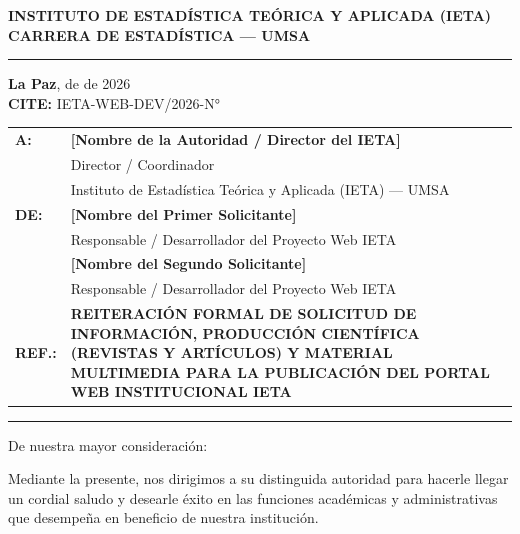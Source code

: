 \documentclass[11pt,letterpaper]{article}
\begin{document}
\begin{center}
    {\large \textbf{\color{ietaBlue}INSTITUTO DE ESTADÍSTICA TEÓRICA Y APLICADA (IETA)}}\\[2pt]
    {\small \textbf{CARRERA DE ESTADÍSTICA --- UMSA}}\\[8pt]
    \rule{\textwidth}{1.2pt}
\end{center}

\vspace{-4pt}
\begin{flushright}
    \small \textbf{La Paz}, \underline{\hspace{1.2cm}} de \underline{\hspace{2.5cm}} de 2026\\[2pt]
    \textbf{CITE:} IETA-WEB-DEV/2026-N° \underline{\hspace{1.5cm}}
\end{flushright}

\vspace{4pt}
\begin{tabularx}{\textwidth}{@{}l X@{}}
    \textbf{A:} & \textbf{[Nombre de la Autoridad / Director del IETA]} \\
                & Director / Coordinador \\
                & Instituto de Estadística Teórica y Aplicada (IETA) --- UMSA \\[6pt]
    \textbf{DE:} & \textbf{[Nombre del Primer Solicitante]} \\
                 & Responsable / Desarrollador del Proyecto Web IETA \\[4pt]
                 & \textbf{[Nombre del Segundo Solicitante]} \\
                 & Responsable / Desarrollador del Proyecto Web IETA \\[6pt]
    \textbf{REF.:} & \textbf{\color{ietaBlue}REITERACIÓN FORMAL DE SOLICITUD DE INFORMACIÓN, PRODUCCIÓN CIENTÍFICA (REVISTAS Y ARTÍCULOS) Y MATERIAL MULTIMEDIA PARA LA PUBLICACIÓN DEL PORTAL WEB INSTITUCIONAL IETA}
\end{tabularx}

\vspace{6pt}
\rule{\textwidth}{0.5pt}

\vspace{4pt}
De nuestra mayor consideración:

Mediante la presente, nos dirigimos a su distinguida autoridad para hacerle llegar un cordial saludo y desearle éxito en las funciones académicas y administrativas que desempeña en beneficio de nuestra institución.
\end{document}
